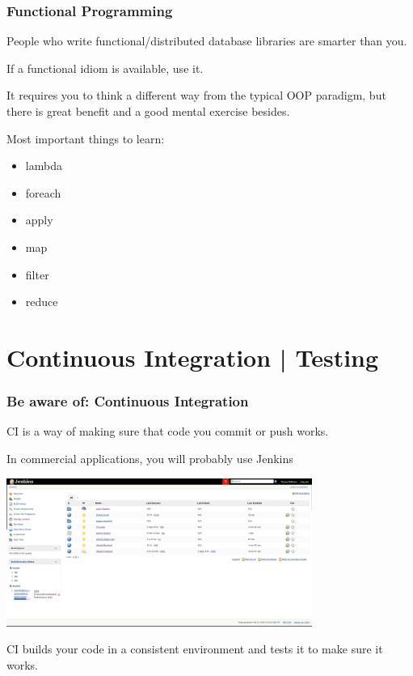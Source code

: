 \documentclass[10pt]{beamer}
\begin{document}
\begin{frame}[c]\frametitle{Functional Programming}

    People who write functional/distributed database libraries are smarter than you.

    \pause

    If a functional idiom is available, \alert{use it}.

    \pause

    It requires you to think a different way from the typical OOP paradigm, but there is great benefit and a good mental exercise besides.

    Most important things to learn:
    \begin{itemize}
    	\item lambda
    	\item foreach
    	\item apply
    	\item map
    	\item filter
    	\item reduce
    \end{itemize}
\end{frame}





















\section{Continuous Integration | Testing}

\begin{frame}[c]\frametitle{Be aware of: Continuous Integration}

CI is a way of making sure that code you commit or push works.

\pause

In commercial applications, you will probably use Jenkins

\pause

\centerline{\includegraphics[width=10cm]{figs/jenkins.png}}

\pause

CI builds your code in a consistent environment and tests it to make sure it works.

\end{frame}
\end{document}
